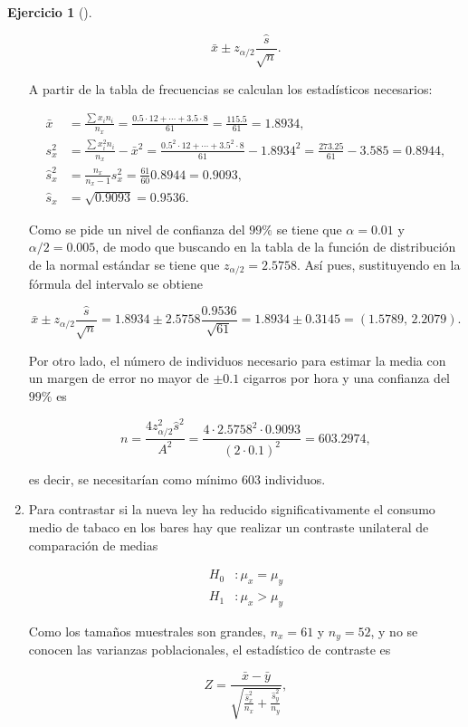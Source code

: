 \documentclass[
  a4paper,
]{scrreport}
\theoremstyle{definition}
\newtheorem{exercise}{Ejercicio}[chapter]
\theoremstyle{remark}
\begin{document}
\begin{exercise}[]
\begin{tcolorbox}
\begin{enumerate}
  \[
  \bar x \pm z_{\alpha/2}\frac{\hat s}{\sqrt n}.
  \]

  A partir de la tabla de frecuencias se calculan los estadísticos
  necesarios:

  \begin{align*}
  \bar x &= \frac{\sum x_in_i}{n_x} = \frac{0.5\cdot12+\cdots+3.5\cdot8}{61} = \frac{115.5}{61} = 1.8934,\\
  s_x^2 & = \frac{\sum x_i^2n_i}{n_x}-\bar x^2 = \frac{0.5^2\cdot12+\cdots+3.5^2\cdot8}{61} -1.8934^2= \frac{273.25}{61}-3.585 = 0.8944,\\
  \hat s_x^2 &= \frac{n_x}{n_x-1}s_x^2 = \frac{61}{60}0.8944 = 0.9093,\\
  \hat s_x & = \sqrt{0.9093} = 0.9536.
  \end{align*}

  Como se pide un nivel de confianza del \(99\%\) se tiene que
  \(\alpha=0.01\) y \(\alpha/2=0.005\), de modo que buscando en la tabla
  de la función de distribución de la normal estándar se tiene que
  \(z_{\alpha/2} =2.5758\). Así pues, sustituyendo en la fórmula del
  intervalo se obtiene

  \[
  \bar x \pm z_{\alpha/2}\frac{\hat s}{\sqrt n} = 1.8934 \pm 2.5758\frac{0.9536}{\sqrt{61}} = 1.8934\pm 0.3145 = (1.5789,\,2.2079).
  \]

  Por otro lado, el número de individuos necesario para estimar la media
  con un margen de error no mayor de \(\pm 0.1\) cigarros por hora y una
  confianza del \(99\%\) es

  \[
  n = \frac{4 z_{\alpha/2}^2 \hat s^2}{A^2} = \frac{4\cdot 2.5758^2 \cdot 0.9093}{(2\cdot 0.1)^2} = 603.2974,
  \]

  es decir, se necesitarían como mínimo \(603\) individuos.
\item
  Para contrastar si la nueva ley ha reducido significativamente el
  consumo medio de tabaco en los bares hay que realizar un contraste
  unilateral de comparación de medias

  \begin{align*}
  H_0 &: \mu_x = \mu_y\\
  H_1 &: \mu_x > \mu_y
  \end{align*}

  Como los tamaños muestrales son grandes, \(n_x=61\) y \(n_y=52\), y no
  se conocen las varianzas poblacionales, el estadístico de contraste es

  \[
  Z = \frac{\bar x -\bar y}{\sqrt{\frac{\hat s_x^2}{n_x}+\frac{\hat s_y^2}{n_y}}},
  \]


\end{enumerate}
\end{tcolorbox}
\end{exercise}
\end{document}
